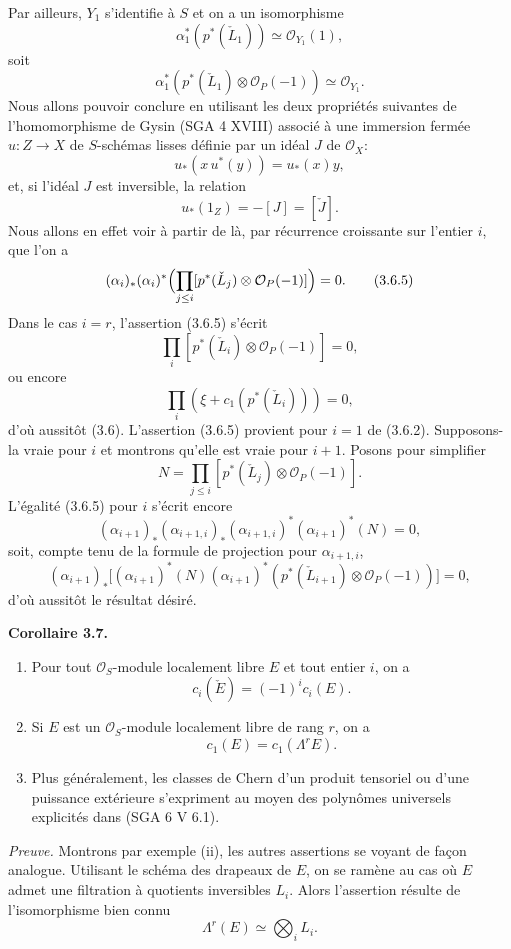 \documentclass[11pt]{article}
\newenvironment{statement}[1]{\par\medskip\noindent\textbf{#1.}\ }{\par\medskip}
\begin{document}
Par ailleurs, $Y_1$ s'identifie à $S$ et on a un isomorphisme
\[
\alpha_1^*(p^*(\check L_1))\simeq\mathcal O_{Y_1}(1),
\]
soit
\[
\alpha_1^*(p^*(\check L_1)\otimes\mathcal O_P(-1))\simeq \mathcal O_{Y_1}.
\tag{3.6.2}
\]
Nous allons pouvoir conclure en utilisant les deux propriétés suivantes de l'homomorphisme de Gysin (SGA 4 XVIII) associé à une immersion fermée $u:Z\to X$ de $S$-schémas lisses définie par un idéal $J$ de $\mathcal O_X$:
\[
u_*(x\,u^*(y))=u_*(x)y,
\tag{3.6.3}
\]
et, si l'idéal $J$ est inversible, la relation
\[
u_*(1_Z)=-[J]=[\check J].
\tag{3.6.4}
\]
Nous allons en effet voir à partir de là, par récurrence croissante sur l'entier $i$, que l'on a
\[
(\alpha_i)_*(\alpha_i)^*\Bigl(\prod_{j\le i}[p^*(\check L_j)\otimes\mathcal O_P(-1)]\Bigr)=0.
\tag{3.6.5}
\]
Dans le cas $i=r$, l'assertion (3.6.5) s'écrit
\[
\prod_i[p^*(\check L_i)\otimes\mathcal O_P(-1)]=0,
\]
ou encore
\[
\prod_i(\xi+c_1(p^*(\check L_i)))=0,
\]
d'où aussitôt (3.6). L'assertion (3.6.5) provient pour $i=1$ de (3.6.2). Supposons-la vraie pour $i$ et montrons qu'elle est vraie pour $i+1$. Posons pour simplifier
\[
N=\prod_{j\le i}[p^*(\check L_j)\otimes\mathcal O_P(-1)].
\]
L'égalité (3.6.5) pour $i$ s'écrit encore
\[
(\alpha_{i+1})_*(\alpha_{i+1,i})_*(\alpha_{i+1,i})^*(\alpha_{i+1})^*(N)=0,
\]
soit, compte tenu de la formule de projection pour $\alpha_{i+1,i}$,
\[
(\alpha_{i+1})_*\bigl[(\alpha_{i+1})^*(N)(\alpha_{i+1})^*(p^*(\check L_{i+1})\otimes\mathcal O_P(-1))\bigr]=0,
\]
d'où aussitôt le résultat désiré.

\begin{statement}{Corollaire 3.7}
\begin{enumerate}[label=(\roman*)]
\item Pour tout $\mathcal O_S$-module localement libre $E$ et tout entier $i$, on a
\[
c_i(\check E)=(-1)^i c_i(E).
\]
\item Si $E$ est un $\mathcal O_S$-module localement libre de rang $r$, on a
\[
c_1(E)=c_1(\Lambda^rE).
\]
\item Plus généralement, les classes de Chern d'un produit tensoriel ou d'une puissance extérieure s'expriment au moyen des polynômes universels explicités dans (SGA 6 V 6.1).
\end{enumerate}
\end{statement}

\emph{Preuve.} Montrons par exemple (ii), les autres assertions se voyant de façon analogue. Utilisant le schéma des drapeaux de $E$, on se ramène au cas où $E$ admet une filtration à quotients inversibles $L_i$. Alors l'assertion résulte de l'isomorphisme bien connu
\[
\Lambda^r(E)\simeq\bigotimes_i L_i.
\]
\end{document}
